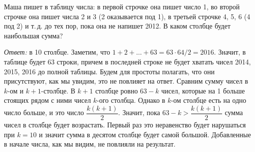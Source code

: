 \problem
Маша пишет в таблицу числа:
в первой строчке она пишет число 1, во второй строчке она пишет числа 2 и 3
(2 оказывается под 1), в третьей строчке 4, 5, 6 (4 под 2) и т.\,д. до тех
пор, пока она не напишет 2012.
В каком столбце будет наибольшая сумма?

\solution
\emph{Ответ:} в 10 столбце.
Заметим, что
$1 + 2 + \ldots + 63 = 63 \cdot 64 / 2 = 2016$.
Значит, в таблице будет 63 строки, причем в последней строке не будет хватать
чисел 2014, 2015, 2016 до полной таблицы.
Будем для простоты полагать, что они присутствуют, как мы увидим, это не
повлияет на ответ.
Сравним сумму чисел в $k$-ом и $k + 1$-столбце.
В $k + 1$ столбце ровно $63 - k$ чисел, которые на 1 больше стоящих рядом с
ними чисел $k$-ого столбца.
Однако в $k$-ом столбце есть на одно число больше, и это число
$\dfrac{k (k + 1)}{2}$.
Значит, пока $63 - k > \dfrac{k (k + 1)}{2}$ сумма чисел в столбце будет
возрастать.
Первый раз это неравенство будет нарушаться при $k = 10$ и значит сумма в
десятом столбце будет самой большой.
Добавленные в начале числа, как мы видим, не повлияли на результат.

\endproblem
